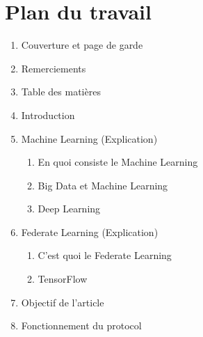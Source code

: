 \documentclass[12pt,a4paper]{article}
\begin{document}
\part*{Plan du travail}

\begin{enumerate}
	\item Couverture et page de garde
	\item Remerciements
	\item Table des matières
	\item Introduction
	\item Machine Learning (Explication)
		\begin{enumerate}
			\item En quoi consiste le Machine Learning
			\item Big Data et Machine Learning
			\item Deep Learning
		\end{enumerate}
	\item Federate Learning (Explication)
		\begin{enumerate}
			\item C'est quoi le Federate Learning
			\item TensorFlow
		\end{enumerate}
	\item Objectif de l'article
	\item Fonctionnement du protocol
\end{enumerate}
	






 
\end{document}
